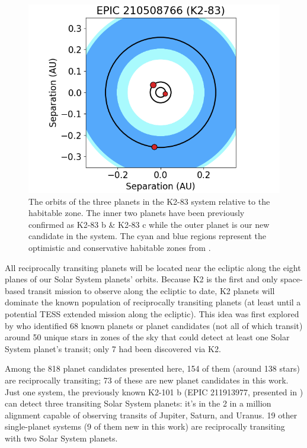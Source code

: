 \documentclass[twocolumn]{aastex62}
\newcommand{\nplanet}{818}
\begin{document}
\begin{figure}[tbp]
\includegraphics[width=\columnwidth]{hz_K2-83.png}
\caption{ The orbits of the three planets in the K2-83 system relative
  to the habitable zone. The inner two planets have been previously
  confirmed as K2-83 b \& K2-83 c while the outer planet is our new
  candidate in the system. The cyan and blue regions represent the
  optimistic and conservative habitable zones from
  \cite{kop13}. \label{fig:hz}}
\end{figure}

All reciprocally transiting planets will be located near the ecliptic
along the eight planes of our Solar System planets' orbits. Because K2
is the first and only space-based transit mission to observe along the
ecliptic to date, K2 planets will dominate the known population of
reciprocally transiting planets (at least until a potential TESS
extended mission along the ecliptic). This idea was first explored by
\cite{wel18} who identified 68 known planets or planet candidates (not
all of which transit) around 50 unique stars in zones of the sky that
could detect at least one Solar System planet's transit; only 7 had
been discovered via K2.

Among the \nplanet{} planet candidates presented here, 154 of them
(around 138 stars) are reciprocally transiting; 73 of these are new
planet candidates in this work. Just one system, the previously known
K2-101 b (EPIC 211913977, presented in \cite{wel18}) can detect three
transiting Solar System planets: it's in the 2 in a million alignment
capable of observing transits of Jupiter, Saturn, and Uranus. 19 other
single-planet systems (9 of them new in this work) are reciprocally
transiting with two Solar System planets.
\end{document}
